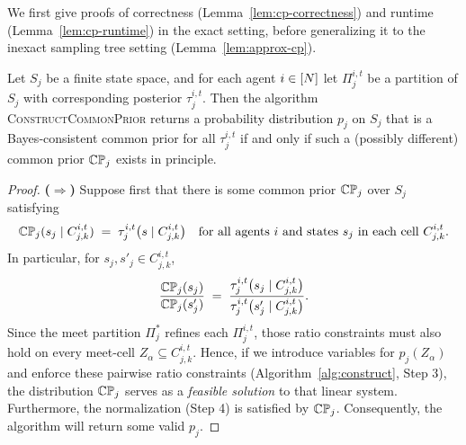 We first give proofs of correctness (Lemma~\ref{lem:cp-correctness}) and runtime (Lemma~\ref{lem:cp-runtime}) in the exact setting, before generalizing it to the inexact sampling tree setting (Lemma~\ref{lem:approx-cp}).
\begin{lemma}
\label{lem:cp-correctness}
Let $S_j$ be a finite state space, and for each agent $i\in[N]$ let
$\Pi_j^{i,t}$ be a partition of $S_j$ with corresponding posterior
$\tau^{i,t}_j$.
Then the algorithm \textsc{ConstructCommonPrior} returns a probability distribution $p_j$ on $S_j$ that is a Bayes‐consistent common prior for all $\tau^{i,t}_j$ if and only if such a (possibly different) common prior $\mathbb{C}\mathbb{P}_j$ exists in principle.
\end{lemma}
\begin{proof}
\textbf{(\(\Longrightarrow\))}\quad
Suppose first that there is some common prior $\mathbb{C}\mathbb{P}_j$ over $S_j$ satisfying
\begin{equation*}
  \mathbb{C}\mathbb{P}_j(s_j \mid C_{j,k}^{i,t})
  \;=\;
  \tau^{i,t}_j\bigl(s \mid C_{j,k}^{i,t}\bigr)
\quad
\text{for all agents $i$ and states $s_j$ in each cell $C_{j,k}^{i,t}$.}
\end{equation*}
In particular, for $s_j,s'_j\in C_{j,k}^{i,t}$,
\begin{equation*}
  \frac{\mathbb{C}\mathbb{P}_j(s_j)}{\mathbb{C}\mathbb{P}_j(s'_j)} 
  \;=\;
  \frac{\tau^{i,t}_j\bigl(s_j \mid C_{j,k}^{i,t}\bigr)}
       {\tau^{i,t}_j\bigl(s'_j \mid C_{j,k}^{i,t}\bigr)}.
\end{equation*}
Since the meet partition $\Pi_j^*$ refines each $\Pi_j^{i,t}$, those ratio constraints must also hold on every meet‐cell $Z_\alpha\subseteq C_{j,k}^{i,t}$.  
Hence, if we introduce variables for $p_j(Z_\alpha)$ and enforce these pairwise ratio constraints (Algorithm~\ref{alg:construct},
Step 3), the distribution $\mathbb{C}\mathbb{P}_j$ serves as a \emph{feasible solution} to that linear system.
Furthermore, the normalization (Step 4) is satisfied by
$\mathbb{C}\mathbb{P}_j$.
Consequently, the algorithm will return some valid $p_j$.

\medskip


\end{proof}
